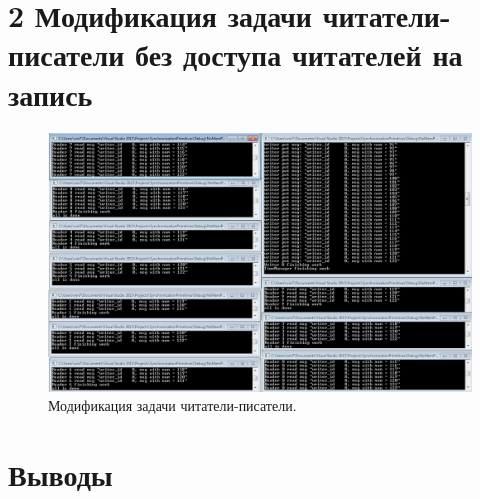 \documentclass[a4paper,12pt]{article} %
\begin{document}
\newpage

\section*{2 Модификация задачи читатели-писатели без доступа читателей на запись}

\begin{figure}[h!]
\centering
\includegraphics[scale=0.50]{res/008}
\caption{Модификация задачи читатели-писатели.}
\end{figure}

\newpage


\section*{Выводы}
\end{document}

